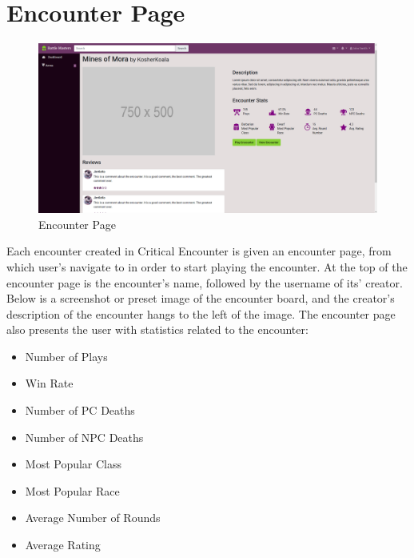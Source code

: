 \documentclass[12pt,a4paper]{report}
\begin{document}
	\section{Encounter Page}
	\begin{figure}[H]
		\centering
		\includegraphics[scale=.20]{encounter}
		\caption{Encounter Page}
		\label{fig: Encounter Page}
	\end{figure}
	Each encounter created in Critical Encounter is given an encounter page, from which user's navigate to in order to start playing the encounter. At the top of the encounter page is the encounter's name, followed by the username of its' creator. Below is a screenshot or preset image of the encounter board, and the creator's description of the encounter hangs to the left of the image. The encounter page also presents the user with statistics related to the encounter:
	\begin{multicols}{2}
		\begin{itemize}
			\item Number of Plays
			\item Win Rate
			\item Number of PC Deaths
			\item Number of NPC Deaths
			\item Most Popular Class
			\item Most Popular Race
			\item Average Number of Rounds
			\item Average Rating
		\end{itemize}
	\end{multicols}
	\newpage
\end{document}

